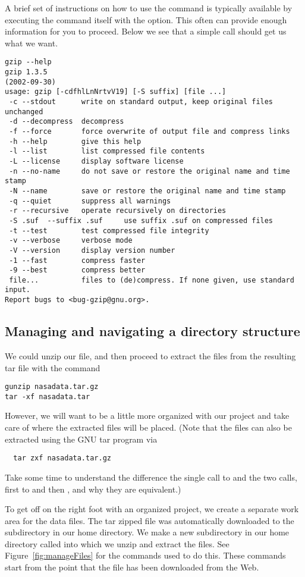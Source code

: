 A brief set of instructions on how to use the command is typically
available by executing the command itself with the 
option.  This often can provide enough information for you to
proceed. Below we see that a simple call  should
get us what we want.
{\footnotesize{
\begin{verbatim}
gzip --help
gzip 1.3.5
(2002-09-30)
usage: gzip [-cdfhlLnNrtvV19] [-S suffix] [file ...]
 -c --stdout      write on standard output, keep original files unchanged
 -d --decompress  decompress
 -f --force       force overwrite of output file and compress links
 -h --help        give this help
 -l --list        list compressed file contents
 -L --license     display software license
 -n --no-name     do not save or restore the original name and time stamp
 -N --name        save or restore the original name and time stamp
 -q --quiet       suppress all warnings
 -r --recursive   operate recursively on directories
 -S .suf  --suffix .suf     use suffix .suf on compressed files
 -t --test        test compressed file integrity
 -v --verbose     verbose mode
 -V --version     display version number
 -1 --fast        compress faster
 -9 --best        compress better
 file...          files to (de)compress. If none given, use standard input.
Report bugs to <bug-gzip@gnu.org>.
\end{verbatim}
}}

\subsection{Managing and navigating a directory structure}
We could unzip our file, and then
proceed to extract the files from the resulting tar file with the
command
\begin{verbatim}
gunzip nasadata.tar.gz
tar -xf nasadata.tar
\end{verbatim} 
However, we will want to be a
little more organized with our project and take care of where the
extracted files will be placed.  (Note that the files can also be
extracted using the GNU tar program via
\begin{verbatim}
  tar zxf nasadata.tar.gz
\end{verbatim}
Take some time to understand the difference the single call to
 and the two calls, first to  and then
, and why they are equivalent.)


To get off on the right foot with an organized project, we create a
separate work area for the data files.  The tar zipped file was
automatically downloaded to the  subdirectory in our
home directory.  We make a new subdirectory in our home directory
called  into which we unzip and extract the files. See
Figure~\ref{fig:manageFiles} for the commands used to do this.  These
commands start from the point that the file has been downloaded from
the Web.

